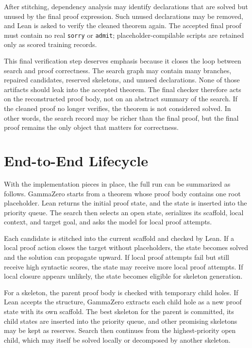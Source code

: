 \documentclass[en]{uet_awesome_thesis/uet-awesome-thesis}
\begin{document}
After stitching, dependency analysis may identify declarations that are solved but unused by the final proof expression. Such unused declarations may be removed, and Lean is asked to verify the cleaned theorem again. The accepted final proof must contain no real \texttt{sorry} or \texttt{admit}; placeholder-compilable scripts are retained only as scored training records.

This final verification step deserves emphasis because it closes the loop between search and proof
correctness. The search graph may contain many branches, repaired candidates, reserved skeletons, and
unused declarations. None of those artifacts should leak into the accepted theorem. The
final checker therefore acts on the reconstructed proof body, not on an abstract summary of the search.
If the cleaned proof no longer verifies, the theorem is not considered solved. In other words, the search
record may be richer than the final proof, but the final proof remains the only object that matters for
correctness.

\section{End-to-End Lifecycle}

With the implementation pieces in place, the full run can be summarized as follows. GammaZero starts
from a theorem whose proof body contains one root placeholder. Lean returns the initial proof state, and
the state is inserted into the priority queue. The search then selects an open state, serializes its scaffold,
local context, and target goal, and asks the model for local proof attempts.

Each candidate is stitched into the current scaffold and checked by Lean. If a local proof action closes
the target without placeholders, the state becomes solved and the solution can propagate upward. If local
proof attempts fail but still receive high syntactic scores, the state may receive more local proof
attempts. If local closure appears unlikely, the state becomes eligible for skeleton generation.

For a skeleton, the parent proof body is checked with temporary child holes. If Lean accepts the
structure, GammaZero extracts each child hole as a new proof state with its own scaffold. The best
skeleton for the parent is committed, its child states are inserted into the priority queue, and other
promising skeletons may be kept as reserves. Search then continues from the highest-priority open child,
which may itself be solved locally or decomposed by another skeleton.
\end{document}
